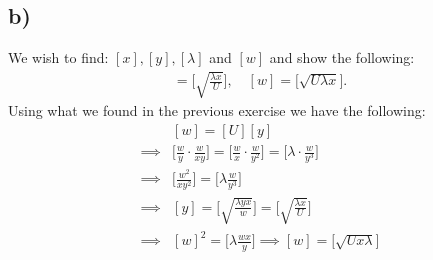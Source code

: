 \documentclass{article}
\begin{document}
\subsection*{b)}
We wish to find: $[x], [y], [\lambda]$ and $[w]$ and show the following:
\begin{align*}
    [y]=\Bigg[\sqrt{\frac{\lambda x}{U}}\Bigg],\quad [w]=\Big[\sqrt{U\lambda x}\Big].
\end{align*}Using what we found in the previous exercise we have the following:
\begin{align*}
    &[w] = [U][y]\\
    \implies& \Big[\frac{w}{y}\cdot\frac{w}{xy}\Big] = \Big[\frac{w}{x}\cdot\frac{w}{y^2}\Big] = \Big[\lambda \cdot \frac{w}{y^3}\Big]\\
    \implies& \Big[\frac{w^2}{xy^2}\Big] = \Big[\lambda \frac{w}{y^3}\Big]\\
    \implies & [y] =\Big[\sqrt{\frac{\lambda y x}{w}}\Big] =\Big[\sqrt{\frac{\lambda x}{U}}\Big]\\
    \implies & [w]^2 = \Big[\lambda\frac{w x}{y}\Big] \implies [w] = \Big[\sqrt{Ux\lambda}\Big]
\end{align*}
\end{document}
